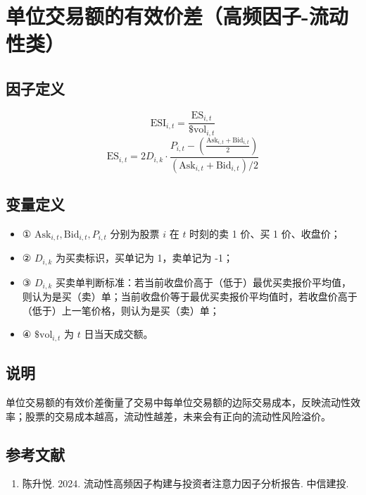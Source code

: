 \documentclass{article}
\begin{document}
\section{单位交易额的有效价差（高频因子-流动性类）}

\subsection{因子定义}
\begin{equation}
    \mathrm{ESI}_{i,t} = \frac{\mathrm{ES}_{i,t}}{\$ \mathrm{vol}_{i,t}}
\end{equation}
\begin{equation}
    \mathrm{ES}_{i,t} = 2 D_{i,k} \cdot \frac{P_{i,t} - \left( \frac{\mathrm{Ask}_{i,t} + \mathrm{Bid}_{i,t}}{2} \right)}{\left( \mathrm{Ask}_{i,t} + \mathrm{Bid}_{i,t} \right)/2}
\end{equation}

\subsection{变量定义}
\begin{itemize}
    \item ① \( \mathrm{Ask}_{i,t}, \mathrm{Bid}_{i,t}, P_{i,t} \) 分别为股票 \( i \) 在 \( t \) 时刻的卖 1 价、买 1 价、收盘价；
    \item ② \( D_{i,k} \) 为买卖标识，买单记为 1，卖单记为 -1；
    \item ③ \( D_{i,k} \) 买卖单判断标准：若当前收盘价高于（低于）最优买卖报价平均值，则认为是买（卖）单；当前收盘价等于最优买卖报价平均值时，若收盘价高于（低于）上一笔价格，则认为是买（卖）单；
    \item ④ \( \$ \mathrm{vol}_{i,t} \) 为 \( t \) 日当天成交额。
\end{itemize}

\subsection{说明}
单位交易额的有效价差衡量了交易中每单位交易额的边际交易成本，反映流动性效率；股票的交易成本越高，流动性越差，未来会有正向的流动性风险溢价。

\subsection{参考文献}
\begin{enumerate}
    \item 陈升悦. 2024. 流动性高频因子构建与投资者注意力因子分析报告. 中信建投.
\end{enumerate}
\end{document}
